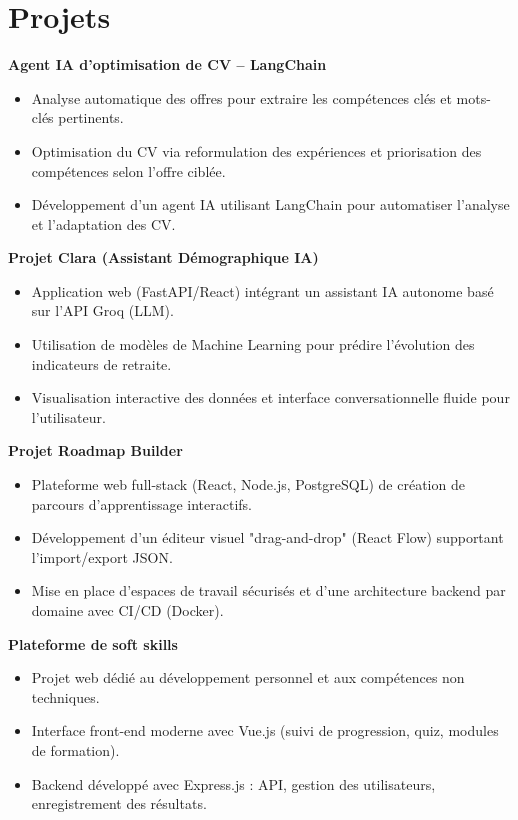 \documentclass[a4paper,11pt]{article}
\begin{document}
\section*{Projets}

\textbf{Agent IA d'optimisation de CV – LangChain}
\begin{itemize}[leftmargin=*, noitemsep]
    \item Analyse automatique des offres pour extraire les compétences clés et mots-clés pertinents.
    \item Optimisation du CV via reformulation des expériences et priorisation des compétences selon l'offre ciblée.
    \item Développement d'un agent IA utilisant LangChain pour automatiser l'analyse et l'adaptation des CV.
\end{itemize}

\textbf{Projet Clara (Assistant Démographique IA)}
\begin{itemize}[leftmargin=*, noitemsep]
    \item Application web (FastAPI/React) intégrant un assistant IA autonome basé sur l'API Groq (LLM).
    \item Utilisation de modèles de Machine Learning pour prédire l'évolution des indicateurs de retraite.
    \item Visualisation interactive des données et interface conversationnelle fluide pour l'utilisateur.
\end{itemize}

\textbf{Projet Roadmap Builder}
\begin{itemize}[leftmargin=*, noitemsep]
    \item Plateforme web full-stack (React, Node.js, PostgreSQL) de création de parcours d'apprentissage interactifs.
    \item Développement d'un éditeur visuel "drag-and-drop" (React Flow) supportant l'import/export JSON.
    \item Mise en place d'espaces de travail sécurisés et d'une architecture backend par domaine avec CI/CD (Docker).
\end{itemize}

\textbf{Plateforme de soft skills}
\begin{itemize}[leftmargin=*, noitemsep]
    \item Projet web dédié au développement personnel et aux compétences non techniques.
    \item Interface front-end moderne avec Vue.js (suivi de progression, quiz, modules de formation).
    \item Backend développé avec Express.js : API, gestion des utilisateurs, enregistrement des résultats.
\end{itemize}
\end{document}
